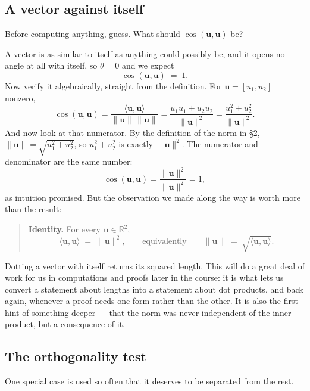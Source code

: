 \documentclass[11pt]{article}
\theoremstyle{definition}
\theoremstyle{remark}
\newcommand{\R}{\mathbb{R}}
\newcommand{\vc}[1]{\mathbf{#1}}
\newcommand{\norm}[1]{\lVert #1\rVert}
\begin{document}
\subsection{A vector against itself}
Before computing anything, guess. What should $\cos(\vc{u},\vc{u})$ be?

A vector is as similar to itself as anything could possibly be, and it opens no
angle at all with itself, so $\theta=0$ and we expect
\[
  \cos(\vc{u},\vc{u}) \;=\; 1 .
\]
Now verify it algebraically, straight from the definition. For
$\vc{u}=[u_1,u_2]$ nonzero,
\[
  \cos(\vc{u},\vc{u})
  = \frac{\langle\vc{u},\vc{u}\rangle}{\norm{\vc{u}}\,\norm{\vc{u}}}
  = \frac{u_1u_1+u_2u_2}{\norm{\vc{u}}^{2}}
  = \frac{u_1^{2}+u_2^{2}}{\norm{\vc{u}}^{2}} .
\]
And now look at that numerator. By the definition of the norm in \S2,
$\norm{\vc{u}}=\sqrt{u_1^{2}+u_2^{2}}$, so $u_1^{2}+u_2^{2}$ is exactly
$\norm{\vc{u}}^{2}$. The numerator and denominator are the same number:
\[
  \cos(\vc{u},\vc{u}) = \frac{\norm{\vc{u}}^{2}}{\norm{\vc{u}}^{2}} = 1,
\]
as intuition promised. But the observation we made along the way is worth more
than the result:

\begin{quote}
\textbf{Identity.} For every $\vc{u}\in\R^{2}$,
\[
  \langle \vc{u},\vc{u}\rangle \;=\; \norm{\vc{u}}^{2},
  \qquad\text{equivalently}\qquad
  \norm{\vc{u}} \;=\; \sqrt{\langle \vc{u},\vc{u}\rangle} .
\]
\end{quote}

\noindent Dotting a vector with itself returns its squared length. This will do
a great deal of work for us in computations and proofs later in the course: it
is what lets us convert a statement about lengths into a statement about dot
products, and back again, whenever a proof needs one form rather than the other.
It is also the first hint of something deeper --- that the norm was never
independent of the inner product, but a consequence of it.

\subsection{The orthogonality test}
One special case is used so often that it deserves to be separated from the rest.
\end{document}
